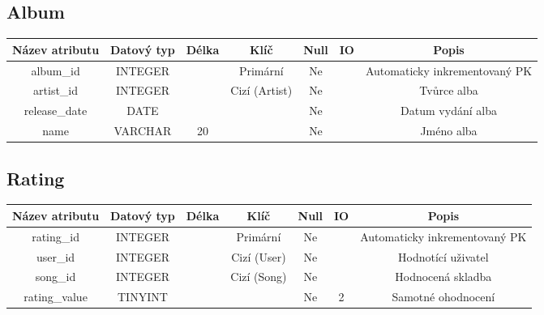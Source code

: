 \subsection*{Album}
\begin{tabular}{ |c|c c c c c|c| }
    \hline
    \textbf{Název atributu} & \textbf{Datový typ} & \textbf{Délka} & \textbf{Klíč} & \textbf{Null} & \textbf{IO} & \textbf{Popis}                         \\
    \hline
    album\_id               & INTEGER             &                & Primární      & Ne            &             & Automaticky inkrementovaný PK \\
    artist\_id              & INTEGER             &                & Cizí (Artist) & Ne            &             & Tvůrce alba                   \\
    release\_date           & DATE                &                &               & Ne            &             & Datum vydání alba             \\
    name                    & VARCHAR             & 20             &               & Ne            &             & Jméno alba                    \\
    \hline
\end{tabular}
\bigskip

\subsection*{Rating}
\begin{tabular}{ |c|c c c c c|c| }
    \hline
    \textbf{Název atributu} & \textbf{Datový typ} & \textbf{Délka} & \textbf{Klíč} & \textbf{Null} & \textbf{IO} & \textbf{Popis}                         \\
    \hline
    rating\_id              & INTEGER             &                & Primární      & Ne            &             & Automaticky inkrementovaný PK \\
    user\_id                & INTEGER             &                & Cizí (User)   & Ne            &             & Hodnotící uživatel            \\
    song\_id                & INTEGER             &                & Cizí (Song)   & Ne            &             & Hodnocená skladba             \\
    rating\_value           & TINYINT             &                &               & Ne            & 2           & Samotné ohodnocení            \\
    \hline
\end{tabular}
\bigskip

